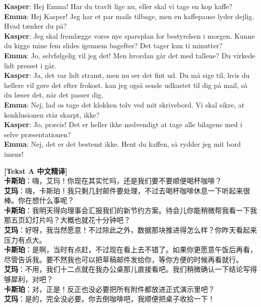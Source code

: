 \begin{tcolorbox}[enhanced, breakable, colback=NCDBgBlue, colframe=NCDNavy, coltitle=white, fonttitle=\bfseries, title={办公室咖啡间协商｜Kasper \& Emma}, arc=2pt, boxrule=0.8pt, left=10pt, right=10pt, top=7pt, bottom=7pt]
\small
\textbf{Kasper}: Hej Emma! Har du  travlt lige nu, eller skal vi  tage en kop kaffe?\\[3pt]
\textbf{Emma}: Hej Kasper! Jeg har  et par mails tilbage, men en kaffepause lyder dejlig. Hvad tænker du på?\\[3pt]
\textbf{Kasper}: Jeg skal fremlægge vores nye spareplan for bestyrelsen i morgen. Kunne du  kigge mine fem slides igennem bagefter? Det tager  kun ti minutter?\\[3pt]
\textbf{Emma}: Jo, selvfølgelig vil jeg det! Men hvordan går det  med tallene? Du virkede lidt presset i går.\\[3pt]
\textbf{Kasper}: Ja, det var lidt stramt, men nu ser det fint ud. Du må  sige til, hvis du hellere vil gøre det efter frokost.  kan jeg også sende udkastet til dig på mail, så du  læser det, når det passer dig.\\[3pt]
\textbf{Emma}: Nej, lad os  tage det klokken tolv ved mit skrivebord. Vi skal  sikre, at konklusionen står skarpt, ikke?\\[3pt]
\textbf{Kasper}: Jo, præcis! Det er  heller ikke nødvendigt at tage alle bilagene med i selve præsentationen?\\[3pt]
\textbf{Emma}: Nej, det er det bestemt ikke. Hent du kaffen, så rydder jeg  mit bord imens!
\end{tcolorbox}

\begin{transbox}
\small
\textbf{\color{NCDTeal}[Tekst A 中文精译]}\\
\textbf{卡斯珀}：嗨，艾玛！你现在其实忙吗，还是我们要不要顺便喝杯咖啡？\\
\textbf{艾玛}：嗨，卡斯珀！我只剩几封邮件要处理，不过去喝杯咖啡休息一下听起来很棒。你在想什么事呢？\\
\textbf{卡斯珀}：我明天得向理事会汇报我们的新节约方案。待会儿你能稍微帮我看一下我那五页幻灯片吗？大概也就花十分钟吧？\\
\textbf{艾玛}：好呀，我当然愿意！不过除此之外，数据那块推进得怎么样？你昨天看起来压力有点大。\\
\textbf{卡斯珀}：是啊，当时有点赶，不过现在看上去不错了。如果你更愿意午饭后再看，尽管告诉我。要不然我也可以把草稿邮件发给你，等你方便的时候再看就行。\\
\textbf{艾玛}：不用，我们十二点就在我办公桌那儿直接看吧。我们稍微确认一下结论写得够犀利，对吧？\\
\textbf{卡斯珀}：对，正是！反正也没必要把所有附件都放进正式演示里吧？\\
\textbf{艾玛}：是的，完全没必要。你去倒咖啡吧，我顺便把桌子收拾一下！
\end{transbox}

